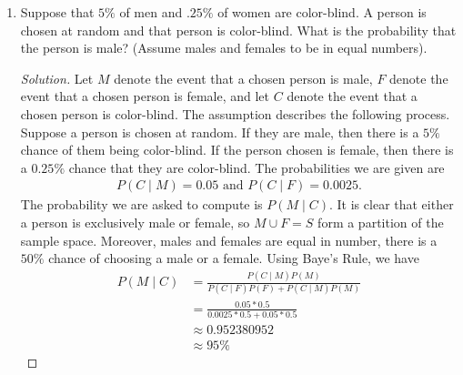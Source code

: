 \documentclass[12pt]{article}
\theoremstyle{definition}
\theoremstyle{plain}
\newenvironment{solution}
  {\begin{proof}[Solution]}
  {\end{proof}}
\renewcommand{\And}{\text{ and }}
\begin{document}
\begin{enumerate}
\begin{solution}
	There are $ N $ candidates in total and each candidate is randomly picked for a given trial. Thus, each candidate is picked for a trial with equal chance. For the first trial, each candidate has probability $ \frac{1}{N} $ that they will be picked. However, this does not speak to what probability they will be hired. On the other hand, if we consider the best candidate, $ B $, from the $ N $ candidates, they have probability $ \frac{1}{N} $ of being hired in the first trial. They will be hired immediately if they are picked since they are the best. Suppose the first trial has passed. Then candidate $ 1 $ was rejected, so there are now $ N - 1 $ candidates left. Candidate $ B $ has probability $ \frac{1}{N-1} $ of being picked and hence of being hired. If we continue in this manner, assuming the $ i -1 $st trial has passed, there are now $ N - (i - 1) $ candidates left. Thus, $ B $ has probability $ \frac{1}{N - (i - 1)} $ of being picked in the $ i $th trial.
\end{solution}

\item Suppose that $ 5 \% $ of men and $ .25 \% $ of women are color-blind. A person is chosen at random and that person is color-blind. What is the probability that the person is male? (Assume males and females to be in equal numbers).

\begin{solution}
	Let $ M $ denote the event that a chosen person is male, $ F $ denote the event that a chosen person is female, and let $ C $ denote the event that a chosen person is color-blind. The assumption describes the following process. Suppose a person is chosen at random. If they are male, then there is a $ 5 \% $ chance of them being color-blind. If the person chosen is female, then there is a $ 0.25 \% $ chance that they are color-blind. The probabilities we are given are
	\begin{align*}
		P(C \mid M) = 0.05 \And P(C \mid F) = 0.0025.
	\end{align*}
	The probability we are asked to compute is $ P(M \mid C) $. It is clear that either a person is exclusively male or female, so $ M \cup F = S $ form a partition of the sample space. Moreover, males and females are equal in number, there is a $ 50\% $ chance of choosing a male or a female. Using Baye's Rule, we have
	\begin{align*}
		P(M \mid C) &= \frac{ P(C \mid M) P(M) }{ P(C \mid F) P(F) + P(C \mid M) P(M)}\\
		&= \frac{ 0.05 * 0.5 }{0.0025 * 0.5 + 0.05 * 0.5}\\
		&\approx 0.952380952\\
		&\approx 95\%
	\end{align*}
\end{solution}


\end{enumerate}
\end{document}
